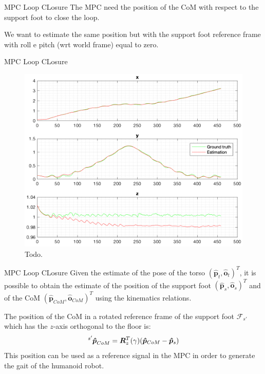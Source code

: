 \documentclass[10pt]{beamer}
\begin{document}
    \begin{frame}{MPC Loop CLosure}
    	The MPC need the position of the CoM with respect to the support
        foot to close the loop.

    	We want to estimate the same position but with the support foot
        reference frame with roll e pitch (wrt world frame) equal to zero.
    \end{frame}

    \begin{frame}{MPC Loop CLosure}
    	\begin{figure}
    	    \centering
            \caption{Todo.}
    	    \includegraphics[scale=0.5]{images/trilateration_com.png}
    	\end{figure}
    \end{frame}

    \begin{frame}{MPC Loop CLosure}
    	Given the estimate of the pose of the torso
        $(\bm{\hat{p}}_t, \bm{\hat{o}}_t)^T$,
        it is possible to obtain the estimate of the position of the support foot
        $(\bm{\hat{p}}_s, \bm{\hat{o}}_s)^T$  and of the CoM $(\bm{\hat{p}}_{CoM}, \bm{\hat{o}}_{CoM})^T$  using the kinematics relations.

        The position of the CoM in a rotated
        reference frame of the support foot $\mathcal{F}_{s'}$ which has the $z$-axis
        orthogonal to the floor is:
        \begin{equation*}
            \tensor[^{s'}]{\bm{\hat{p}}}{_{CoM}} = \bm{R}^{T}_{z}(\gamma)(\bm{\hat{p}}_{CoM}-\bm{\hat{p}}_{s})
        \end{equation*}
        This position can be used as a reference signal
        in the MPC in order to generate the gait of the humanoid robot.
    \end{frame}
\end{document}

